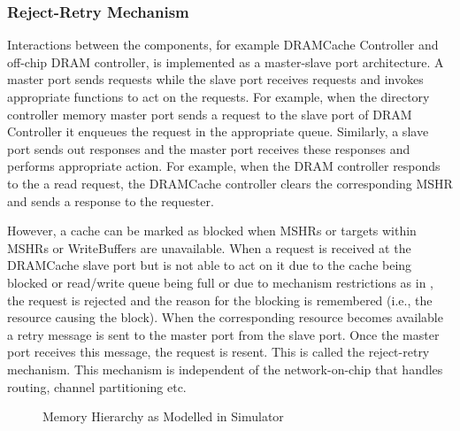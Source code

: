 \subsubsection{Reject-Retry Mechanism} Interactions between the components, for example DRAMCache Controller and off-chip DRAM controller, is implemented as a master-slave port architecture. A master port sends requests while the slave port receives requests and invokes appropriate functions to act on the requests. For example, when the directory controller memory master port sends a request to the slave port of DRAM Controller it enqueues the request in the appropriate queue. Similarly, a slave port sends out responses and the master port receives these responses and performs appropriate action. For example, when the DRAM controller responds to the a read request, the DRAMCache controller clears the corresponding MSHR and sends a response to the requester.
\par However, a cache can be marked as blocked when MSHRs or targets within MSHRs or WriteBuffers are unavailable. When a request is received at the DRAMCache slave port but is not able to act on it due to the cache being blocked or read/write queue being full or due to mechanism restrictions as in \prioname, the request is rejected and the reason for the blocking is remembered (i.e., the resource causing the block). When the corresponding resource becomes available a retry message is sent to the master port from the slave port. Once the master port receives this message, the request is resent. This is called the reject-retry mechanism. This mechanism is independent of the network-on-chip that handles routing, channel partitioning etc.
\begin{figure}[!htb]
	\centering
	\def\svgwidth{\columnwidth}
	
	\caption{Memory Hierarchy as Modelled in Simulator}
	\label{fig:simulator-memory}
\end{figure}

